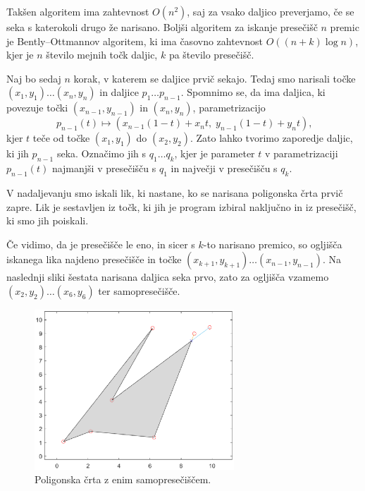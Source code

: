 \documentclass{article}
\begin{document}
Takšen algoritem ima zahtevnost $O(n^2)$, saj za vsako daljico preverjamo, če se seka s katerokoli 
drugo že narisano. Boljši algoritem za iskanje presečišč $n$ premic je Bently--Ottmannov algoritem,
ki ima časovno zahtevnost $O ((n + k) \log n)$, kjer je $n$ število mejnih točk daljic, $k$ pa število 
presečišč. 

Naj bo sedaj $n$ korak, v katerem se daljice prvič sekajo. Tedaj smo narisali točke $(x_1, y_1) \dots (x_n, y_n)$
in daljice $p_1 \dots p_{n-1}$.
Spomnimo se, da ima daljica, ki povezuje točki $(x_{n-1}, y_{n-1})$ in $(x_n, y_n)$, parametrizacijo
$$ p_{n-1} (t) \mapsto ( x_{n-1} (1 - t) + x_n t, \; y_{n-1} (1 - t) + y_n t) \text{,}$$
kjer $t$ teče od točke $(x_1, y_1)$ do $(x_2, y_2)$. Zato lahko tvorimo zaporedje daljic, ki jih $p_{n-1}$ seka.
Označimo jih s $q_1 \dots q_k$, kjer je parameter $t$ v parametrizaciji $p_{n-1} (t)$ najmanjši v presečišču s $q_1$
in največji v presečišču s $q_k$.

V nadaljevanju smo iskali lik, ki nastane, ko se narisana poligonska črta prvič zapre. 
Lik je sestavljen iz točk, ki jih je program izbiral naključno in iz presečišč, ki smo jih poiskali.

Če vidimo, da je presečišče le eno, in sicer s $k$-to narisano premico, so ogljišča iskanega lika najdeno presečišče 
in točke $(x_{k+1}, y_{k+1}) \dots (x_{n-1}, y_{n-1})$. Na naslednji sliki šestata narisana daljica seka prvo, zato
za ogljišča vzamemo $(x_2, y_2) \dots (x_6, y_6)$ ter samopresečišče.
\begin{figure}[H]
    \centering
        \includegraphics[height = 6cm]{eno_presecisce.eps}
        \caption{Poligonska črta z enim samopresečiščem.}
\end{figure}
\end{document}
